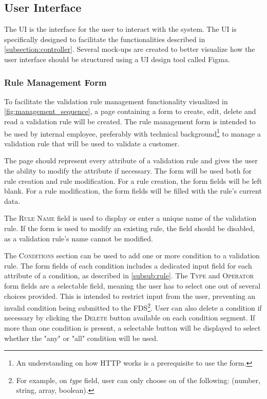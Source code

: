 \subsection{User Interface}
  \label{sub:design_view}

The UI is the interface for the user to interact with the system. The UI is specifically designed to facilitate the functionalities described in \autoref{subsection:controller}. Several mock-ups are created to better visualize how the user interface should be structured using a UI design tool called Figma.  

\subsubsection{Rule Management Form}

To facilitate the validation rule management functionality visualized in \autoref{fig:management_sequence}, a page containing a form to create, edit, delete and read a validation rule will be created. The rule management form is intended to be used by internal employee, preferably with technical background\footnote{An understanding on how HTTP works is a prerequisite to use the form.} to manage a validation rule that will be used to validate a customer.

The page should represent every attribute of a validation rule and gives the user the ability to modify the attribute if necessary. The form will be used both for rule creation and rule modification. For a rule creation, the form fields will be left blank. For a rule modification, the form fields will be filled with the rule's current data. 

The \textsc{Rule Name} field is used to display or enter a unique name of the validation rule. If the form is used to modify an existing rule, the field should be disabled, as a validation rule's name cannot be modified. 

The \textsc{Conditions} section can be used to add one or more condition to a validation rule. The form fields of each condition includes a dedicated input field for each attribute of a condition, as described in \autoref{subsub:rule}. The \textsc{Type} and \textsc{Operator} form fields are a selectable field, meaning the user has to select one out of several choices provided. This is intended to restrict input from the user, preventing an invalid condition being submitted to the FDS\footnote{For example, on \emph{type} field, user can only choose on of the following: (number, string, array, boolean).}. User can also delete a condition if necessary by clicking the \textsc{Delete} button available on each condition segment. If more than one condition is present, a selectable button will be displayed to select whether the "any" or "all" condition will be used. 

